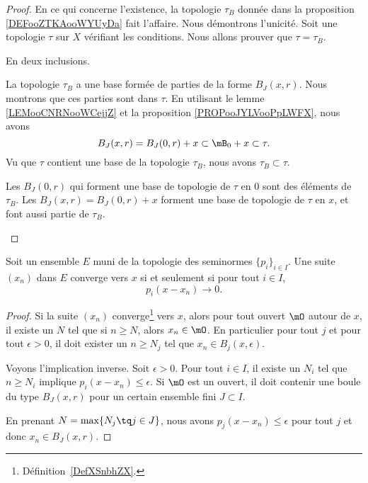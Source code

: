 \begin{proof}
	En ce qui concerne l'existence, la topologie \( \tau_B\) donnée dans la proposition \ref{DEFooZTKAooWYUyDa} fait l'affaire. Nous démontrons l'unicité. Soit une topologie \( \tau\) sur \( X\) vérifiant les conditions. Nous allons prouver que \( \tau=\tau_B\).

	En deux inclusions.
	\begin{subproof}
		La topologie \( \tau_B\) a une base formée de parties de la forme \( B_J(x,r)\). Nous montrons que ces parties sont dans \( \tau\). En utilisant le lemme \ref{LEMooCNRNooWCejjZ} et la proposition \ref{PROPooJYLVooPpLWFX}, nous avons
		\begin{equation}
			B_J(x,r)=B_J(0,r)+x\subset \mB_0+x\subset \tau.
		\end{equation}
		Vu que \( \tau \) contient une base de la topologie \( \tau_B\), nous avons \( \tau_B\subset \tau\).

		Les \( B_J(0,r)\) qui forment une base de topologie de \( \tau\) en \( 0\) sont des éléments de \( \tau_B\). Les \( B_J(x,r)=B_J(0,r)+x\) forment une base de topologie de \( \tau\) en \( x\), et font aussi partie de \( \tau_B\).
	\end{subproof}
\end{proof}

\begin{proposition} \label{PropQPzGKVk}
	Soit un ensemble \( E\) muni de la topologie des seminormes \( \{ p_i \}_{i\in I}\). Une suite \( (x_n)\) dans \( E\) converge vers \( x\) si et seulement si pour tout \( i\in I\),
	\begin{equation}
		p_i(x-x_n)\to 0.
	\end{equation}
\end{proposition}

\begin{proof}
	Si la suite \( (x_n)\) converge\footnote{Définition~\ref{DefXSnbhZX}.} vers \( x\), alors pour tout ouvert \( \mO\) autour de \( x\), il existe un \( N\) tel que si \( n\geq N\), alors \( x_n\in\mO\). En particulier pour tout \( j\) et pour tout \( \epsilon>0\), il doit exister un \( n\geq N_j\) tel que \( x_n\in B_j(x,\epsilon)\).

	Voyons l'implication inverse. Soit \( \epsilon>0\). Pour tout \( i\in I\), il existe un \( N_i\) tel que \( n\geq N_i\) implique \( p_i(x-x_n)\leq \epsilon\). Si \( \mO\) est un ouvert, il doit contenir une boule du type \( B_J(x,r)\) pour un certain ensemble fini \( J\subset I\).

	En prenant \( N=\max\{ N_j\tq j\in J \}\), nous avons \( p_j(x-x_n)\leq \epsilon\) pour tout \( j\) et donc \( x_n\in B_J(x,r)\).
\end{proof}

